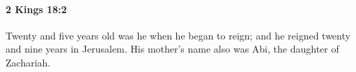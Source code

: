 
		\paragraph{2 Kings 18:2} %
			\label{2KINGS-18-2}

			Twenty and five years old was he when he began to reign; and he reigned twenty and nine years in Jerusalem. His mother’s name also was Abi, the daughter of Zachariah.


